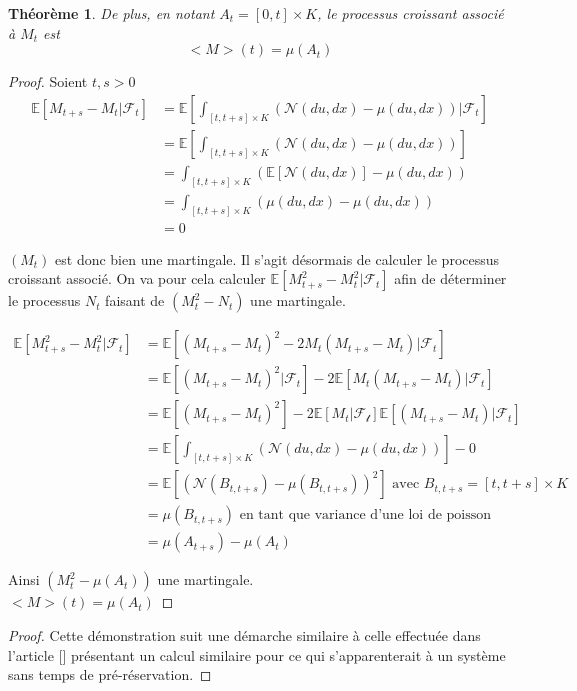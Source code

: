 \documentclass[12pt,a4paper]{article}
\newcommand{\E}[1]{\mathbb{E}\left[ #1 \right]}
\newcommand{\1}[1]{\mathbbm{1}_{\{#1\}} }
\newtheorem{theorem}{Théorème}
\theoremstyle{definition}
\begin{document}
{\begin{theorem}{ }
De plus, en notant $A_t = [0,t] \times K$, le processus croissant associé à $M_t$ est 
$$<M>(t) = \mu(A_t)$$
\end{theorem}


\begin{proof}{}

Soient $t,s>0$
\begin{align*}
\E{M_{t+s} - M_t|\mathcal{F}_t} &= \E{\int_{[t,t+s] \times K} \left(\mathcal{N}(du,dx) - \mu(du,dx)\right)|\mathcal{F}_t}\\
&= \E{\int_{[t,t+s] \times K} \left(\mathcal{N}(du,dx) - \mu(du,dx)\right)}\\
&=\int_{[t,t+s] \times K} \left(\E{\mathcal{N}(du,dx)} - \mu(du,dx)\right)\\
&=\int_{[t,t+s] \times K} \left(\mu(du,dx) - \mu(du,dx)\right)\\
&= 0
\end{align*}

$(M_t)$ est donc bien une martingale.
Il s'agit désormais de calculer le processus croissant associé. On va pour cela calculer $\E{M_{t+s}^2 - M_t^2|\mathcal{F}_t}$ afin de déterminer le processus $N_t$ faisant de $(M_t^2-N_t)$ une martingale.

\begin{align*}
\E{M_{t+s}^2 - M_t^2|\mathcal{F}_t} &= \E{(M_{t+s} - M_t)^2 - 2 M_t(M_{t+s} - M_t)|\mathcal{F}_t}\\
&= \E{(M_{t+s} - M_t)^2|\mathcal{F}_t} - 2 \E{M_t(M_{t+s} - M_t)|\mathcal{F}_t}\\
&= \E{(M_{t+s} - M_t)^2} - 2 \E{M_t|\mathcal{F_t}} \E{(M_{t+s} - M_t)|\mathcal{F}_t}\\
&= \E{\int_{[t,t+s] \times K} \left(\mathcal{N}(du,dx) - \mu(du,dx)\right)} - 0 \\
&= \E{\left(\mathcal{N}(B_{t,t+s}) - \mu(B_{t,t+s})\right)^2} \text{ avec } B_{t,t+s} = [t,t+s]\times K\\
&= \mu(B_{t,t+s}) \text{ en tant que variance d'une loi de poisson}\\
&= \mu(A_{t+s}) - \mu(A_{t})
\end{align*}

Ainsi $(M_t^2-\mu(A_{t}))$ une martingale.\\
$<M>(t) = \mu(A_{t})$

\end{proof}



\begin{proof}

Cette démonstration suit une démarche similaire à  celle effectuée dans l'article [] présentant un calcul similaire pour ce qui s'apparenterait à un système sans temps de pré-réservation.



\end{proof}}
\end{document}
